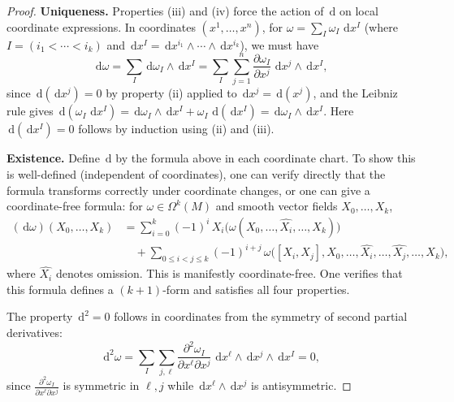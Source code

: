 \documentclass[12pt,a4paper,openany]{book}
\theoremstyle{definition}
\theoremstyle{remark}
\newcommand{\dd}{\,\mathrm{d}}
\begin{document}
\begin{proof}
\textbf{Uniqueness.} Properties (iii) and (iv) force the action of $\dd$ on
local coordinate expressions. In coordinates $(x^1, \ldots, x^n)$, for
$\omega = \sum_I \omega_I\, \dd x^I$ (where $I = (i_1 < \cdots < i_k)$
and $\dd x^I = \dd x^{i_1} \wedge \cdots \wedge \dd x^{i_k}$), we must have
\[
  \dd\omega = \sum_I \dd\omega_I \wedge \dd x^I
    = \sum_I \sum_{j=1}^{n} \frac{\partial \omega_I}{\partial x^j}\,
      \dd x^j \wedge \dd x^I,
\]
since $\dd(\dd x^j) = 0$ by property (ii) applied to $\dd x^j = \dd(x^j)$,
and the Leibniz rule gives
$\dd(\omega_I\, \dd x^I) = \dd\omega_I \wedge \dd x^I
  + \omega_I\, \dd(\dd x^I) = \dd\omega_I \wedge \dd x^I$.
Here $\dd(\dd x^I) = 0$ follows by induction using (ii) and (iii).

\medskip\noindent
\textbf{Existence.} Define $\dd$ by the formula above in each coordinate chart.
To show this is well-defined (independent of coordinates), one can verify
directly that the formula transforms correctly under coordinate changes, or
one can give a coordinate-free formula: for $\omega \in \Omega^k(M)$ and
smooth vector fields $X_0, \ldots, X_k$,
\begin{align*}
  (\dd\omega)(X_0, \ldots, X_k) &= \sum_{i=0}^{k} (-1)^i\,
    X_i\bigl(\omega(X_0, \ldots, \widehat{X_i}, \ldots, X_k)\bigr) \\
  &\quad + \sum_{0 \leq i < j \leq k} (-1)^{i+j}\,
    \omega\bigl([X_i, X_j], X_0, \ldots, \widehat{X_i}, \ldots,
      \widehat{X_j}, \ldots, X_k\bigr),
\end{align*}
where $\widehat{X_i}$ denotes omission. This is manifestly coordinate-free.
One verifies that this formula defines a $(k+1)$-form and satisfies
all four properties.

The property $\dd^2 = 0$ follows in coordinates from the symmetry of
second partial derivatives:
\[
  \dd^2 \omega = \sum_I \sum_{j,\ell}
    \frac{\partial^2 \omega_I}{\partial x^\ell \partial x^j}\,
    \dd x^\ell \wedge \dd x^j \wedge \dd x^I = 0,
\]
since $\frac{\partial^2 \omega_I}{\partial x^\ell \partial x^j}$ is
symmetric in $\ell, j$ while $\dd x^\ell \wedge \dd x^j$ is antisymmetric.
\end{proof}
\end{document}
